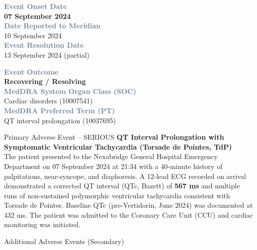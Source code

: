 \documentclass[11pt,a4paper]{scrartcl}
\newcommand{\fieldlabel}[1]{%
  \textcolor{SlateGray}{\footnotesize\textbf{#1}}%
}
\newcommand{\fieldvalue}[1]{%
  {\normalsize #1}%
}
\begin{document}
\begin{minipage}[t]{0.48\linewidth}
\fieldlabel{Event Onset Date}\\
\fieldvalue{\textbf{07 September 2024}}\\[3pt]
\fieldlabel{Date Reported to Meridian}\\
\fieldvalue{10 September 2024}\\[3pt]
\fieldlabel{Event Resolution Date}\\
\fieldvalue{13 September 2024 (partial)}
\end{minipage}%
\hfill%
\begin{minipage}[t]{0.48\linewidth}
\fieldlabel{Event Outcome}\\
\fieldvalue{\textbf{Recovering / Resolving}}\\[3pt]
\fieldlabel{MedDRA System Organ Class (SOC)}\\
\fieldvalue{Cardiac disorders (10007541)}\\[3pt]
\fieldlabel{MedDRA Preferred Term (PT)}\\
\fieldvalue{QT interval prolongation (10037695)}
\end{minipage}

\vspace{4mm}

\begin{alertbox}[width=\linewidth]{{\faExclamationCircle}\quad Primary Adverse Event -- SERIOUS}
\small
\textbf{QT Interval Prolongation with Symptomatic Ventricular Tachycardia (Torsade de Pointes, TdP)}\\[4pt]
The patient presented to the Nexabridge General Hospital Emergency Department on 07 September 2024 at 21:34 with a 40-minute history of palpitations, near-syncope, and diaphoresis. A 12-lead ECG recorded on arrival demonstrated a corrected QT interval (QTc, Bazett) of \textbf{567 ms} and multiple runs of non-sustained polymorphic ventricular tachycardia consistent with Torsade de Pointes. Baseline QTc (pre-Vertidorin, June 2024) was documented at 432 ms. The patient was admitted to the Coronary Care Unit (CCU) and cardiac monitoring was initiated.
\end{alertbox}

\vspace{3mm}

\begin{subsecbox}{Additional Adverse Events (Secondary)}
\end{subsecbox}
\end{document}
